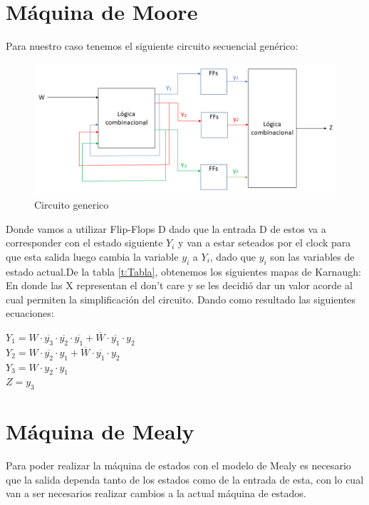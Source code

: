 \section{Máquina de Moore}
Para nuestro caso tenemos el siguiente circuito secuencial genérico:\\
\FloatBarrier
\begin{figure}[h!]
	\centering
	\includegraphics[scale=0.4]{../Ejercicio-2/Maquina_Moore.png}
	\caption{Circuito generico}
\end{figure}
\FloatBarrier
Donde vamos a utilizar Flip-Flops D dado que la entrada D de estos va a corresponder con el estado siguiente $Y_i$ y van a estar seteados por el clock para que esta salida luego cambia la variable $y_i$ a $Y_i$, dado que $y_i$ son las variables de estado actual.De la tabla \ref{t:Tabla}, obtenemos los siguientes mapas de Karnaugh:\\
\FloatBarrier
\FloatBarrier
En donde las X representan el don't care y se les decidió dar un valor acorde al cual permiten la simplificación del circuito. Dando como resultado las siguientes ecuaciones:\\
\begin{center}
	$Y_1 = W \cdot \overline{ y_3 } \cdot \overline{ y_2} \cdot \overline{ y_1 } + \overline{ W } \cdot \overline{ y_1} \cdot y_2  $\\
	$Y_2 = W \cdot \overline{ y_2} \cdot  y_1  + \overline{ W } \cdot \overline{ y_1} \cdot y_2  $\\
	$Y_3 = W \cdot  y_2 \cdot  y_1   $\\
	$Z = y_3  $\\
\end{center}
\section{Máquina de Mealy}
Para poder realizar la máquina de estados con el modelo de Mealy es necesario que la salida dependa tanto de los estados como de la entrada de esta, con lo cual van a ser necesarios realizar cambios a la actual máquina de estados.\\